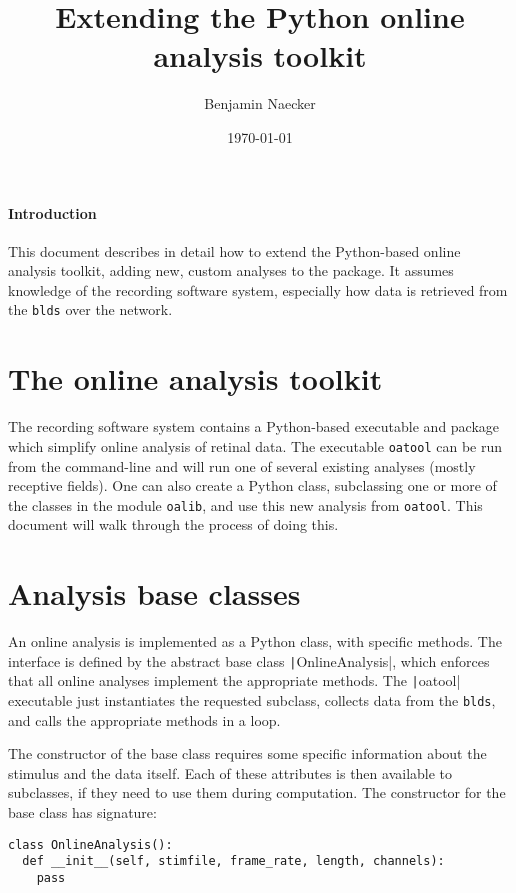 \documentclass[12pt]{article}
\title{Extending the Python online analysis toolkit}
\author{Benjamin Naecker}
\date{\today}
\begin{document}
\maketitle

\paragraph{Introduction} This document describes in detail how to extend
the Python-based online analysis toolkit, adding new, custom analyses to
the package. It assumes knowledge of the recording software system, especially
how data is retrieved from the \texttt{blds} over the network.

\section*{The online analysis toolkit}

The recording software system contains a Python-based executable and package
which simplify online analysis of retinal data. The executable \texttt{oatool}
can be run from the command-line and will run one of several existing analyses
(mostly receptive fields). One can also create a Python class, subclassing one or
more of the classes in the module \texttt{oalib}, and use this new analysis
from \texttt{oatool}. This document will walk through the process of doing this.

\section*{Analysis base classes}

An online analysis is implemented as a Python class, with specific methods.
The interface is defined by the abstract base class \texttt|OnlineAnalysis|,
which enforces that all online analyses implement the appropriate methods. The
\texttt|oatool| executable just instantiates the requested subclass,
collects data from the \texttt{blds}, and calls the appropriate methods in a loop.

The constructor of the base class requires some specific information about the
stimulus and the data itself. Each of these attributes is then available to
subclasses, if they need to use them during computation. The constructor for
the base class has signature:

\begin{verbatim}
class OnlineAnalysis():
  def __init__(self, stimfile, frame_rate, length, channels):
    pass
\end{verbatim}
\end{document}
